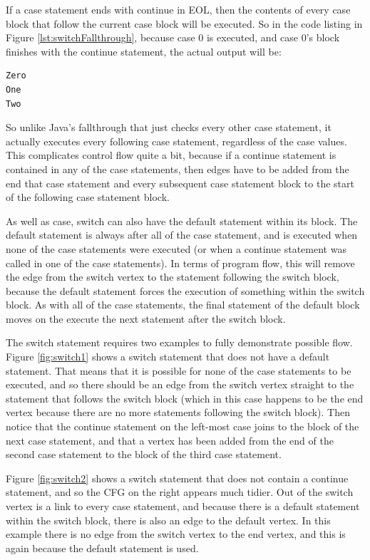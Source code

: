 If a case statement ends with continue in EOL, then the contents of every case block that follow the current case block will be executed. So in the code listing in Figure \ref{lst:switchFallthrough}, because case 0 is executed, and case 0's block finishes with the continue statement, the actual output will be:

\begin{verbatim}
Zero
One
Two
\end{verbatim}

So unlike Java's fallthrough that just checks every other case statement, it actually executes every following case statement, regardless of the case values. This complicates control flow quite a bit, because if a continue statement is contained in any of the case statements, then edges have to be added from the end that case statement and every subsequent case statement block to the start of the following case statement block.

As well as case, switch can also have the default statement within its block. The default statement is always after all of the case statement, and is executed when none of the case statements were executed (or when a continue statement was called in one of the case statements). In terms of program flow, this will remove the edge from the switch vertex to the statement following the switch block, because the default statement forces the execution of something within the switch block. As with all of the case statements, the final statement of the default block moves on the execute the next statement after the switch block.

The switch statement requires two examples to fully demonstrate possible flow. Figure \ref{fig:switch1} shows a switch statement that does not have a default statement. That means that it is possible for none of the case statements to be executed, and so there should be an edge from the switch vertex straight to the statement that follows the switch block (which in this case happens to be the end vertex because there are no more statements following the switch block). Then notice that the continue statement on the left-most case joins to the block of the next case statement, and that a vertex has been added from the end of the second case statement to the block of the third case statement.

Figure \ref{fig:switch2} shows a switch statement that does not contain a continue statement, and so the CFG on the right appears much tidier. Out of the switch vertex is a link to every case statement, and because there is a default statement within the switch block, there is also an edge to the default vertex. In this example there is no edge from the switch vertex to the end vertex, and this is again because the default statement is used.


